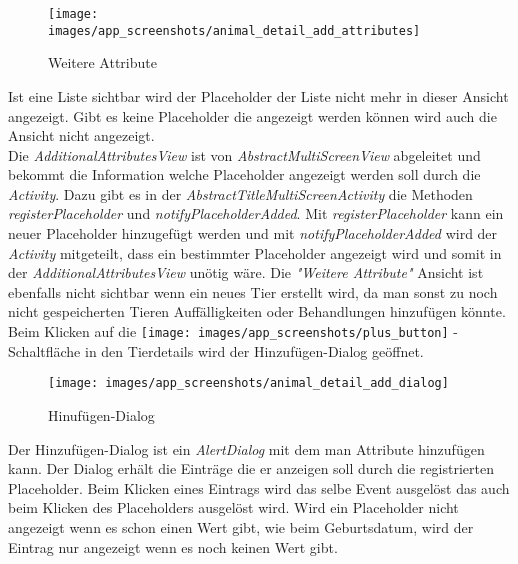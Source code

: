 \begin{figure}[H]
\centering
\texttt{[image: images/app\_screenshots/animal\_detail\_add\_attributes]}
\caption{Weitere Attribute}
\end{figure} 
Ist eine Liste sichtbar wird der Placeholder der Liste nicht mehr in dieser Ansicht angezeigt. Gibt es keine Placeholder die angezeigt werden können wird auch die Ansicht nicht angezeigt. \\ 
Die \textit{AdditionalAttributesView} ist von \textit{AbstractMultiScreenView} abgeleitet und bekommt die Information welche Placeholder angezeigt werden soll durch die \textit{Activity}. Dazu gibt es in der \textit{AbstractTitleMultiScreenActivity} die Methoden \textit{registerPlaceholder} und \textit{notifyPlaceholderAdded}. Mit \textit{registerPlaceholder} kann ein neuer Placeholder hinzugefügt werden und mit \textit{notifyPlaceholderAdded} wird der \textit{Activity} mitgeteilt, dass ein bestimmter Placeholder angezeigt wird und somit in der \textit{AdditionalAttributesView} unötig wäre.
Die \textit{"Weitere Attribute"} Ansicht ist ebenfalls nicht sichtbar wenn ein neues Tier erstellt wird, da man sonst zu noch nicht gespeicherten Tieren Auffälligkeiten oder Behandlungen hinzufügen könnte. \\[0.5em]
Beim Klicken auf die \texttt{[image: images/app\_screenshots/plus\_button]} - Schaltfläche in den Tierdetails wird der Hinzufügen-Dialog geöffnet.
\begin{figure}[H]
\centering
\texttt{[image: images/app\_screenshots/animal\_detail\_add\_dialog]}
\caption{Hinufügen-Dialog}
\end{figure}
Der Hinzufügen-Dialog ist ein \textit{AlertDialog} mit dem man Attribute hinzufügen kann. Der Dialog erhält die Einträge die er anzeigen soll durch die registrierten Placeholder. Beim Klicken eines Eintrags wird das selbe Event ausgelöst das auch beim Klicken des Placeholders ausgelöst wird. Wird ein Placeholder nicht angezeigt wenn es schon einen Wert gibt, wie beim Geburtsdatum, wird der Eintrag nur angezeigt wenn es noch keinen Wert gibt.